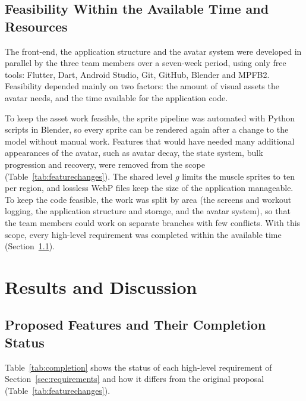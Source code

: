 \documentclass[11pt]{article}
\begin{document}
\subsection{Feasibility Within the Available
Time and Resources}

The front-end, the application structure and the avatar system were developed in parallel by the three team
members over a seven-week period, using only free tools: Flutter, Dart, Android Studio, Git, GitHub, Blender and
MPFB2. Feasibility depended mainly on two factors: the amount of visual assets the avatar needs, and the time
available for the application code.

To keep the asset work feasible, the sprite pipeline was automated with Python scripts in Blender, so every sprite
can be rendered again after a change to the model without manual work. Features that would have needed many
additional appearances of the avatar, such as avatar decay, the state system, bulk progression and recovery, were
removed from the scope (Table~\ref{tab:featurechanges}). The shared level $g$ limits the muscle sprites to ten per
region, and lossless WebP files keep the size of the application manageable. To keep the code feasible, the work was
split by area (the screens and workout logging, the application structure and storage, and the avatar system), so
that the team members could work on separate branches with few conflicts. With this scope, every high-level
requirement was completed within the available time (Section~\ref{sec:completion}).

\section{Results and Discussion}

\subsection{Proposed Features and Their Completion Status}
\label{sec:completion}

Table~\ref{tab:completion} shows the status of each high-level requirement of Section~\ref{sec:requirements} and how it differs from the original proposal (Table~\ref{tab:featurechanges}).
\end{document}
